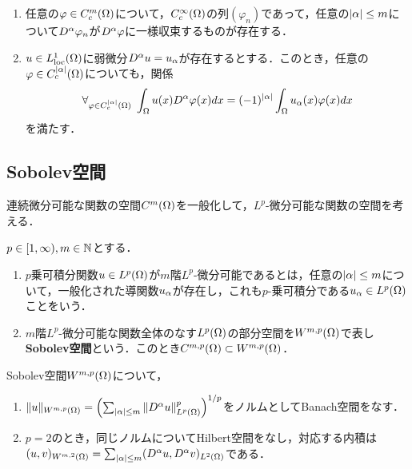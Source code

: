\documentclass[uplatex,dvipdfmx]{jsreport}
\begin{document}
\begin{proposition}\mbox{}
    \begin{enumerate}
        \item 任意の$\varphi\in C_c^m(\Omega)$について，$C_c^\infty(\Omega)$の列$(\varphi_n)$であって，任意の$\lvert\alpha\rvert\le m$について$D^\alpha\varphi_n$が$D^\alpha\varphi$に一様収束するものが存在する．
        \item $u\in L^1_{\mathrm{loc}}(\Omega)$に弱微分$D^\alpha u=u_\alpha$が存在するとする．このとき，任意の$\varphi\in C^{\lvert\alpha\rvert}_c(\Omega)$についても，関係
        \[\forall_{\varphi\in C_c^{\lvert\alpha\rvert}(\Omega)}\;\int_\Omega u(x)D^\alpha\varphi(x)dx=(-1)^{\lvert\alpha\rvert}\int_\Omega u_\alpha(x)\varphi(x)dx\]
        を満たす．
    \end{enumerate}
\end{proposition}

\subsection{Sobolev空間}

\begin{tcolorbox}[colframe=ForestGreen, colback=ForestGreen!10!white,breakable,colbacktitle=ForestGreen!40!white,coltitle=black,fonttitle=\bfseries\sffamily,
title=]
    連続微分可能な関数の空間$C^m(\Omega)$を一般化して，$L^p$-微分可能な関数の空間を考える．
\end{tcolorbox}

\begin{definition}
    $p\in[1,\infty),m\in\mathbb{N}$とする．
    \begin{enumerate}
        \item $p$乗可積分関数$u\in L^p(\Omega)$が$m$階$L^p$-微分可能であるとは，任意の$\lvert\alpha\rvert\le m$について，一般化された導関数$u_\alpha$が存在し，これも$p$-乗可積分である$u_\alpha\in L^p(\Omega)$ことをいう．
        \item $m$階$L^p$-微分可能な関数全体のなす$L^p(\Omega)$の部分空間を$W^{m,p}(\Omega)$で表し\textbf{Sobolev空間}という．このとき$C^{m,p}(\Omega)\subset W^{m,p}(\Omega)$．
    \end{enumerate}
\end{definition}

\begin{theorem}
    Sobolev空間$W^{m,p}(\Omega)$について，
    \begin{enumerate}
        \item $\|u\|_{W^{m,p}(\Omega)}=\left(\sum_{\lvert\alpha\rvert\le m}\|D^\alpha u\|^p_{L^p(\Omega)}\right)^{1/p}$をノルムとしてBanach空間をなす．
        \item $p=2$のとき，同じノルムについてHilbert空間をなし，対応する内積は$(u,v)_{W^{m,2}(\Omega)}=\sum_{\lvert\alpha\rvert\le m}(D^\alpha u,D^\alpha v)_{L^2(\Omega)}$である．
    \end{enumerate}
\end{theorem}
\end{document}
